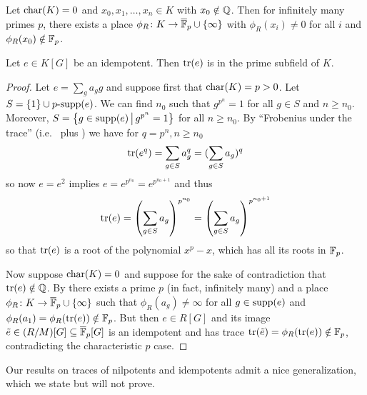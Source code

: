 \begin{corollary}
    \label{corollary:to_frobenius_density_theorem}
    Let $\mathrm{char}(K) = 0$ and $x_0, x_1, \dots, x_n \in K$ with $x_0 \notin \mathbb{Q}$.
    Then for infinitely many primes $p$, there exists a place $\phi_R \colon K \to \overline{\mathbb{F}}_p \cup \{\infty\}$ with $\phi_R(x_i) \neq 0$ for all $i$ and $\phi_R(x_0) \notin \mathbb{F}_p$.
\end{corollary}

\begin{theorem}[Zalesskii]
    \label{theorem:zalesskii}
    Let $e \in K[G]$ be an idempotent.
    Then $\operatorname{tr}(e)$ is in the prime subfield of $K$.
\end{theorem}

\begin{proof}
    Let $e = \sum_{g} a_g g$ and suppose first that $\mathrm{char}(K) = p > 0$.
    Let $S = \{1\} \cup \text{$p$-supp}(e)$.
    We can find $n_0$ such that $g^{p^n} = 1$ for all $g \in S$ and $n \geq n_0$.
    Moreover, $S = \left\{ g \in \operatorname{supp}(e) \,\middle|\, g^{p^n} = 1 \right\}$ for all $n \geq n_0$.
    By ``Frobenius under the trace'' (i.e.\  plus ) we have for $q = p^n, n \geq n_0$ \[
        \operatorname{tr}(e^q) = \sum_{g \in S} a_g^q = (\sum_{g \in S} a_g)^q
    \] so now $e = e^2$ implies $e = e^{p^{n_0}} = e^{p^{n_0+1}}$ and thus \[
        \operatorname{tr}(e) = \left( \sum_{g \in S} a_g \right)^{p^{n_0}} = \left( \sum_{g \in S} a_g \right)^{p^{n_0+1}}
    \] so that $\operatorname{tr}(e)$ is a root of the polynomial $x^p - x$, which has all its roots in $\mathbb{F}_p$.

    Now suppose $\mathrm{char}(K) = 0 $ and suppose for the sake of contradiction that $\operatorname{tr}(e) \notin \mathbb{Q}$.
    By  there exists a prime $p$ (in fact, infinitely many) and a place $\phi_R \colon K \to \overline{\mathbb{F}}_p \cup \{\infty\}$ such that $\phi_R(a_g) \neq \infty$ for all $g \in \operatorname{supp}(e)$ and $\phi_R(a_1) = \phi_R(\operatorname{tr}(e)) \notin \mathbb{F}_p$.
    But then $e \in R[G]$ and its image $\tilde{e} \in (R/M)[G] \subseteq \overline{\mathbb{F}}_p[G]$ is an idempotent and has trace $\operatorname{tr}(\tilde{e}) = \phi_R(\operatorname{tr}(e)) \notin \mathbb{F}_p$, contradicting the characteristic $p$ case.
\end{proof}

Our results on traces of nilpotents and idempotents admit a nice generalization, which we state but will not prove.

